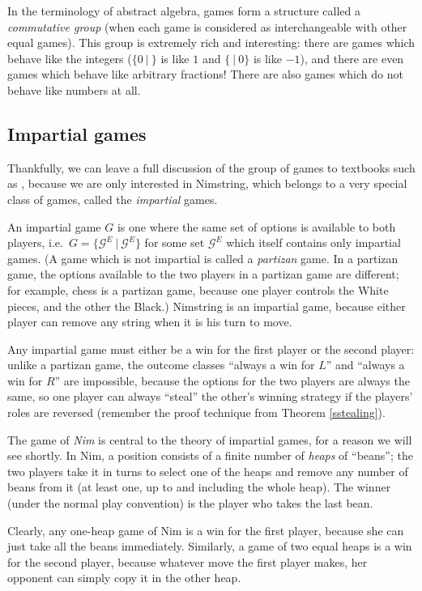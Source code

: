 \documentclass[a4paper,twocolumn]{article}
\newcommand{\cgtgame}[2]{\{#1 \:|\: #2\}}
\begin{document}
In the terminology of abstract algebra, games form a structure called
a \emph{commutative group} (when each game is considered as
interchangeable with other equal games). This group is extremely rich
and interesting: there are games which behave like the integers
($\cgtgame{0}{}$ is like $1$ and $\cgtgame{}{0}$ is like $-1$), and
there are even games which behave like arbitrary fractions! There are
also games which do not behave like numbers at all.

\subsection{Impartial games}

Thankfully, we can leave a full discussion of the group of games to
textbooks such as \cite{lip}, because we are only interested in
Nimstring, which belongs to a very special class of games, called the
\emph{impartial} games.

An impartial game $G$ is one where the same set of options is
available to both players, i.e.\ $G =
\cgtgame{\mathcal{G}^E}{\mathcal{G}^E}$ for some set $\mathcal{G}^E$
which itself contains only impartial games. (A game which is not
impartial is called a \emph{partizan} game. In a partizan game, the
options available to the two players in a partizan game are different;
for example, chess is a partizan game, because one player controls the
White pieces, and the other the Black.) Nimstring is an impartial
game, because either player can remove any string when it is his turn
to move.

Any impartial game must either be a win for the first player or the
second player: unlike a partizan game, the outcome classes ``always a
win for $L$'' and ``always a win for $R$'' are impossible, because the
options for the two players are always the same, so one player can
always ``steal'' the other's winning strategy if the players' roles
are reversed (remember the proof technique from Theorem
\ref{sstealing}).

The game of \emph{Nim} is central to the theory of impartial games,
for a reason we will see shortly. In Nim, a position consists of a
finite number of \emph{heaps} of ``beans''; the two players take it in
turns to select one of the heaps and remove any number of beans from
it (at least one, up to and including the whole heap). The winner
(under the normal play convention) is the player who takes the last
bean.

Clearly, any one-heap game of Nim is a win for the first player,
because she can just take all the beans immediately. Similarly, a game
of two equal heaps is a win for the second player, because whatever
move the first player makes, her opponent can simply copy it in the
other heap.
\end{document}
